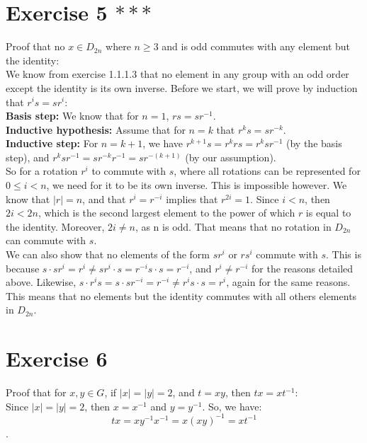 \documentclass[12pt]{article}
\begin{document}
    \section*{Exercise 5 $***$}
    Proof that no $x \in D_{2n}$ where $n \geqslant 3$ and is odd
    commutes with any element but the identity: \\
    We know from exercise 1.1.1.3 that no element in any group with
    an odd order except the identity is its own inverse.
    Before we start, we will prove by induction that $r^is = sr^i$: \\
    \textbf{Basis step:}
    We know that for $n = 1$, $rs = sr^{-1}$. \\
    \textbf{Inductive hypothesis:}
    Assume that for $n = k$ that $r^ks = sr^{-k}$. \\
    \textbf{Inductive step:}
    For $n = k + 1$,
    we have $r^{k+1}s = r^krs = r^ksr^{-1}$ (by the basis step),
    and $r^ksr^{-1} = sr^{-k}r^{-1} = sr^{-(k+1)}$ (by our assumption). \\
    So for a rotation $r^i$ to commute with $s$,
    where all rotations can be represented for $0 \leqslant i < n$,
    we need for it to be its own inverse.
    This is impossible however.
    We know that $|r| = n$, 
    and that $r^i = r^{-i}$ implies that $r^{2i} = 1$.
    Since $i < n$,
    then $2i < 2n$, which is the second largest element to the power of
    which $r$ is equal to the identity.
    Moreover, $2i \neq n$, as n is odd.
    That means that no rotation in $D_{2n}$ can commute with $s$. \\
    We can also show that no elements of the form $sr^i$ or $rs^i$
    commute with $s$.
    This is because $s \cdot sr^i = r^i
    \neq sr^i \cdot s
    = r^{-i}s \cdot s
    = r^{-i}$,
    and $r^i \neq r^{-i}$ for the reasons detailed above.
    Likewise, $s \cdot r^is = s \cdot sr^{-i}
    = r^{-i}
    \neq r^is \cdot s
    = r^i$,
    again for the same reasons.
    This means that no elements but the identity commutes with all others
    elements in $D_{2n}$.


    \section*{Exercise 6}
    Proof that for $x, y \in G$, if $|x| = |y| = 2$, and $t = xy$,
    then $tx = xt^{-1}$: \\
    Since $|x| = |y| = 2$,
    then $x = x^{-1}$ and $y = y^{-1}$.
    So, we have:
    \[tx = xy^{-1}x^{-1} = x(xy)^{-1} = xt^{-1}\].
\end{document}
